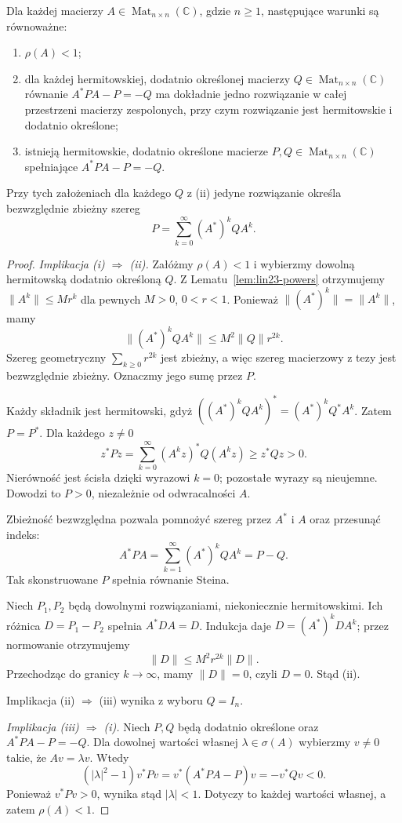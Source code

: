 \begin{twierdzenie}
\label{thm:lin23-lyapunov}
Dla każdej macierzy
\(A\in\operatorname{Mat}_{n\times n}(\mathbb C)\),
gdzie \(n\ge1\),
następujące warunki są równoważne:
\begin{enumerate}[label=\textup{(\roman*)}]
 \item \(\rho(A)<1\);
 \item dla każdej hermitowskiej,
 dodatnio określonej macierzy
 \(Q\in\operatorname{Mat}_{n\times n}(\mathbb C)\)
 równanie \(A^*PA-P=-Q\)
 ma dokładnie jedno rozwiązanie
 w całej przestrzeni macierzy
 zespolonych, przy czym
 rozwiązanie jest hermitowskie
 i dodatnio określone;
 \item istnieją hermitowskie,
 dodatnio określone macierze
 \(P,Q\in\operatorname{Mat}_{n\times n}(\mathbb C)\)
 spełniające \(A^*PA-P=-Q\).
\end{enumerate}
Przy tych założeniach
dla każdego \(Q\) z \textup{(ii)}
jedyne rozwiązanie określa
bezwzględnie zbieżny szereg
\[
 P=\sum_{k=0}^{\infty}(A^*)^kQA^k.
\]
\end{twierdzenie}
\begin{proof}
\emph{Implikacja (i) \(\Rightarrow\) (ii).}
Załóżmy \(\rho(A)<1\)
i wybierzmy dowolną hermitowską
dodatnio określoną \(Q\).
Z Lematu~\ref{lem:lin23-powers}
otrzymujemy \(\|A^k\|\le Mr^k\)
dla pewnych \(M>0\), \(0<r<1\).
Ponieważ
\(\|(A^*)^k\|=\|A^k\|\),
mamy
\[
 \|(A^*)^kQA^k\|
 \le M^2\|Q\|r^{2k}.
\]
Szereg geometryczny
\(\sum_{k\ge0}r^{2k}\)
jest zbieżny, a więc
szereg macierzowy z tezy
jest bezwzględnie zbieżny.
Oznaczmy jego sumę przez \(P\).

Każdy składnik jest hermitowski,
gdyż
\(((A^*)^kQA^k)^*
 =(A^*)^kQ^*A^k\).
Zatem \(P=P^*\).
Dla każdego \(z\ne0\)
\[
 z^*Pz=\sum_{k=0}^{\infty}
       (A^kz)^*Q(A^kz)
 \ge z^*Qz>0.
\]
Nierówność jest ścisła dzięki
wyrazowi \(k=0\);
pozostałe wyrazy są nieujemne.
Dowodzi to \(P>0\),
niezależnie od odwracalności \(A\).

Zbieżność bezwzględna pozwala
pomnożyć szereg przez \(A^*\)
i \(A\) oraz przesunąć indeks:
\[
 A^*PA=\sum_{k=1}^{\infty}
       (A^*)^kQA^k=P-Q.
\]
Tak skonstruowane \(P\)
spełnia równanie Steina.

Niech \(P_1,P_2\) będą
dowolnymi rozwiązaniami,
niekoniecznie hermitowskimi.
Ich różnica \(D=P_1-P_2\)
spełnia \(A^*DA=D\).
Indukcja daje
\(D=(A^*)^kDA^k\);
przez normowanie otrzymujemy
\[
 \|D\|\le M^2r^{2k}\|D\|.
\]
Przechodząc do granicy
\(k\to\infty\), mamy
\(\|D\|=0\), czyli \(D=0\).
Stąd (ii).

Implikacja (ii) \(\Rightarrow\) (iii)
wynika z wyboru \(Q=I_n\).

\emph{Implikacja (iii) \(\Rightarrow\) (i).}
Niech \(P,Q\) będą dodatnio
określone oraz
\(A^*PA-P=-Q\).
Dla dowolnej wartości własnej
\(\lambda\in\sigma(A)\)
wybierzmy \(v\ne0\)
takie, że \(Av=\lambda v\).
Wtedy
\[
 (|\lambda|^2-1)v^*Pv
 =v^*(A^*PA-P)v
 =-v^*Qv<0.
\]
Ponieważ \(v^*Pv>0\),
wynika stąd \(|\lambda|<1\).
Dotyczy to każdej wartości własnej,
a zatem \(\rho(A)<1\).
\end{proof}

